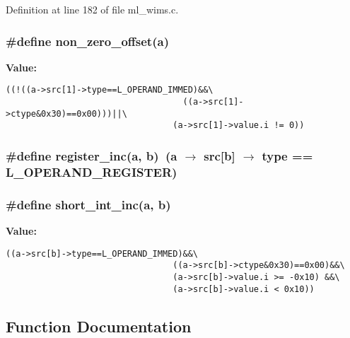 Definition at line 182 of file ml\_\-wims.c.
\subsubsection{\setlength{\rightskip}{0pt plus 5cm}\#define non\_\-zero\_\-offset(a)}\label{ml__wims_8c_1a7d03fa0a676d3b09e555d8c8176f1b}


\textbf{Value:}

\begin{Code}\begin{verbatim}((!((a->src[1]->type==L_OPERAND_IMMED)&&\
                                   ((a->src[1]->ctype&0x30)==0x00)))||\
                                 (a->src[1]->value.i != 0))
\end{verbatim}\end{Code}
\subsubsection{\setlength{\rightskip}{0pt plus 5cm}\#define register\_\-inc(a, b)~(a $\rightarrow$ src[b] $\rightarrow$ type == L\_\-OPERAND\_\-REGISTER)}\label{ml__wims_8c_1e7b7d7ff33cab42b74ae66e888b1124}


\subsubsection{\setlength{\rightskip}{0pt plus 5cm}\#define short\_\-int\_\-inc(a, b)}\label{ml__wims_8c_beca719e984ec0dc73106055269cd986}


\textbf{Value:}

\begin{Code}\begin{verbatim}((a->src[b]->type==L_OPERAND_IMMED)&&\
                                 ((a->src[b]->ctype&0x30)==0x00)&&\
                                 (a->src[b]->value.i >= -0x10) &&\
                                 (a->src[b]->value.i < 0x10))
\end{verbatim}\end{Code}


\subsection{Function Documentation}
